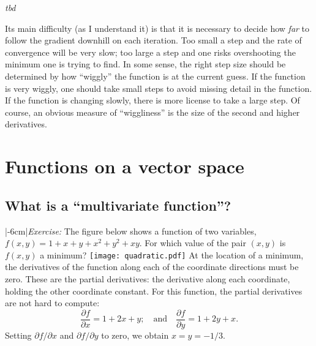 \documentclass[10pt, a4paper]{article}
\begin{document}
\emph{tbd}

Its main difficulty (as I understand it) is that it is necessary to
decide how \emph{far} to follow the gradient downhill on each
iteration. Too small a step and the rate of convergence will be very
slow; too large a step and one risks overshooting the minimum one is
trying to find. In some sense, the right step size should be
determined by how “wiggly” the function is at the current guess. If
the function is very wiggly, one should take small steps to avoid
missing detail in the function. If the function is changing slowly,
there is more license to take a large step. Of course, an obvious
measure of “wiggliness” is the size of the second and higher
derivatives.


\section{Functions on a vector space}
\subsection{What is a ``multivariate function''?}

\sidenote*|-6cm|{\emph{Exercise:} The figure below shows a
  function of two variables, $f(x,y)=1+x+y+x^2+y^2+xy$. For which
  value of the pair $(x,y)$ is $f(x,y)$ a minimum?\sidepar%
    {\centering\texttt{[image: quadratic.pdf]}}\sidepar%
  At the location of a minimum, the derivatives of the function along
  each of the coordinate directions must be zero. These are the
  partial derivatives: the derivative along each coordinate, holding
  the other coordinate constant. For this function, the partial
  derivatives are not hard to compute:
\begin{equation*}
  \frac{\partial f}{\partial x} = 1 + 2x + y;\quad\text{and}\quad
  \frac{\partial f}{\partial y} = 1 + 2y + x.
\end{equation*}
Setting $\partial f/\partial x$ and $\partial f/\partial y$ to zero, we obtain
$x = y = -1/3$.}

\end{document}
